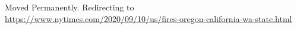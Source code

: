 Moved Permanently. Redirecting to
\url{https://www.nytimes.com/2020/09/10/us/fires-oregon-california-wa-state.html}
